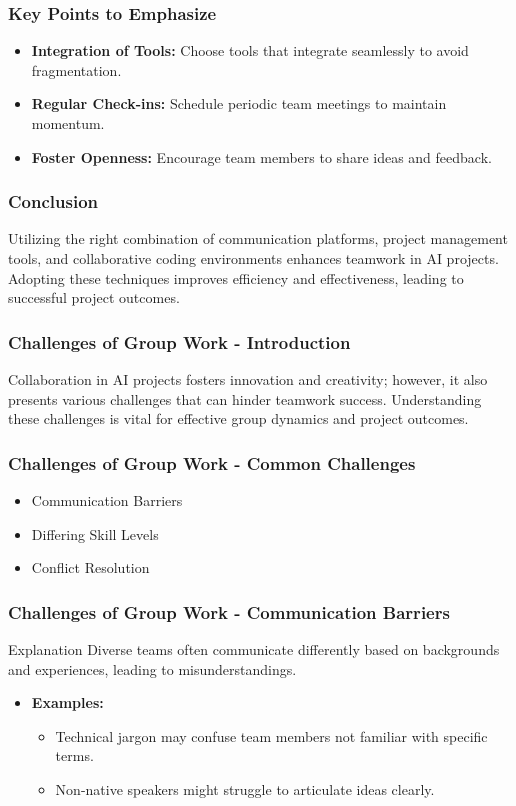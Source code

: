 \documentclass[aspectratio=169]{beamer}
\begin{document}
\begin{frame}[fragile]
    \frametitle{Key Points to Emphasize}
    \begin{itemize}
        \item \textbf{Integration of Tools:} Choose tools that integrate seamlessly to avoid fragmentation.
        \item \textbf{Regular Check-ins:} Schedule periodic team meetings to maintain momentum.
        \item \textbf{Foster Openness:} Encourage team members to share ideas and feedback.
    \end{itemize}
\end{frame}

\begin{frame}[fragile]
    \frametitle{Conclusion}
    Utilizing the right combination of communication platforms, project management tools, and collaborative coding environments enhances teamwork in AI projects. Adopting these techniques improves efficiency and effectiveness, leading to successful project outcomes.
\end{frame}

\begin{frame}[fragile]
    \frametitle{Challenges of Group Work - Introduction}
    Collaboration in AI projects fosters innovation and creativity; however, it also presents various challenges that can hinder teamwork success. Understanding these challenges is vital for effective group dynamics and project outcomes.
\end{frame}

\begin{frame}[fragile]
    \frametitle{Challenges of Group Work - Common Challenges}
    \begin{itemize}
        \item Communication Barriers
        \item Differing Skill Levels
        \item Conflict Resolution
    \end{itemize}
\end{frame}

\begin{frame}[fragile]
    \frametitle{Challenges of Group Work - Communication Barriers}
    \begin{block}{Explanation}
        Diverse teams often communicate differently based on backgrounds and experiences, leading to misunderstandings.
    \end{block}
    \begin{itemize}
        \item \textbf{Examples:}
        \begin{itemize}
            \item Technical jargon may confuse team members not familiar with specific terms.
            \item Non-native speakers might struggle to articulate ideas clearly.
        \end{itemize}
    \end{itemize}
\end{frame}
\end{document}
